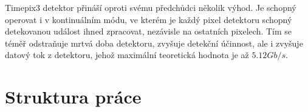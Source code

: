 Timepix3 detektor přináší oproti svému předchůdci několik výhod. Je schopný operovat i v kontinuálním módu, ve kterém je každý pixel detektoru schopný detekovanou událost ihned zpracovat, nezávisle na ostatních pixelech. Tím se téměř odstraňuje mrtvá doba detektoru, zvyšuje detekční účinnost, ale i zvyšuje datový tok z detektoru, jehož maximální teoretická hodnota je až $5.12 Gb/s$.

\section{Struktura práce}
\todo